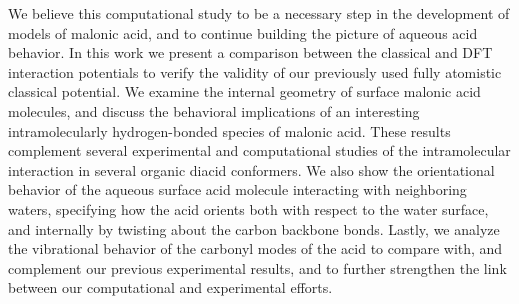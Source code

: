 We believe this computational study to be a necessary step in the development of models of malonic acid, and to continue building the picture of aqueous acid behavior. In this work we present a comparison between the classical and DFT interaction potentials to verify the validity of our previously used fully atomistic classical potential. We examine the internal geometry of surface malonic acid molecules, and discuss the behavioral implications of an interesting intramolecularly hydrogen-bonded species of malonic acid. These results complement several experimental and computational studies of the intramolecular interaction in several organic diacid conformers.\cite{Mohajeri2004,Dopieralski2011,Darvas2011,Nilsson1998,Chen2000,Eberson1959,Macoas2000,Macoas2000a,Merchan1984,Nguyen2005,Nieminen1992} We also show the orientational behavior of the aqueous surface acid molecule interacting with neighboring waters, specifying how the acid orients both with respect to the water surface, and internally by twisting about the carbon backbone bonds. Lastly, we analyze the vibrational behavior of the carbonyl modes of the acid to compare with, and complement our previous experimental results, and to further strengthen the link between our computational and experimental efforts.
